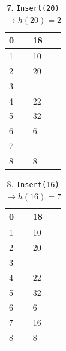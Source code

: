 \documentclass[11pt, letterpaper, titlepage]{article}
\begin{document}
\begin{enumerate}[label=\alph*)]
\begin{paracol}{2}
        \begin{table}[H]
            \small
            \centering
            \caption{7. \texttt{Insert(20)} $\rightarrow h(20) = 2$}
            \begin{tabular}{|m{3em}|m{7em}|}
                \hline
                0 & 18 \\ \hline
                1 & 10 \\ \hline
                2 & 20 \\ \hline
                3 &  \\ \hline
                4 & 22 \\ \hline
                5 & 32 \\ \hline
                6 & 6 \\ \hline
                7 &  \\ \hline
                8 & 8 \\ \hline
            \end{tabular}
        \end{table}

        \switchcolumn

        \begin{table}[H]
            \small
            \centering
            \caption{8. \texttt{Insert(16)} $\rightarrow h(16) = 7$}
            \begin{tabular}{|m{3em}|m{7em}|}
                \hline
                0 & 18 \\ \hline
                1 & 10 \\ \hline
                2 & 20 \\ \hline
                3 &  \\ \hline
                4 & 22 \\ \hline
                5 & 32 \\ \hline
                6 & 6 \\ \hline
                7 & 16 \\ \hline
                8 & 8 \\ \hline
            \end{tabular}
        \end{table}

        \switchcolumn


\end{paracol}
\end{enumerate}
\end{document}
